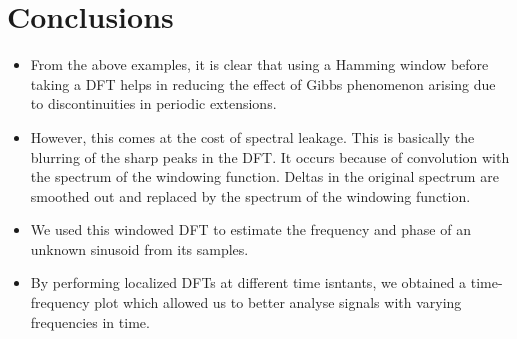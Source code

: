 \documentclass[11pt]{article}
\providecommand{\tightlist}{%
      \setlength{\itemsep}{0pt}\setlength{\parskip}{0pt}}
\begin{document}
    \section{Conclusions}\label{conclusions}

\begin{itemize}
\tightlist
\item
  From the above examples, it is clear that using a Hamming window
  before taking a DFT helps in reducing the effect of Gibbs phenomenon
  arising due to discontinuities in periodic extensions.
\item
  However, this comes at the cost of spectral leakage. This is basically
  the blurring of the sharp peaks in the DFT. It occurs because of
  convolution with the spectrum of the windowing function. Deltas in the
  original spectrum are smoothed out and replaced by the spectrum of the
  windowing function.
\item
  We used this windowed DFT to estimate the frequency and phase of an
  unknown sinusoid from its samples.
\item
  By performing localized DFTs at different time isntants, we obtained a
  time-frequency plot which allowed us to better analyse signals with
  varying frequencies in time.
\end{itemize}


    
    
    
    
\end{document}
